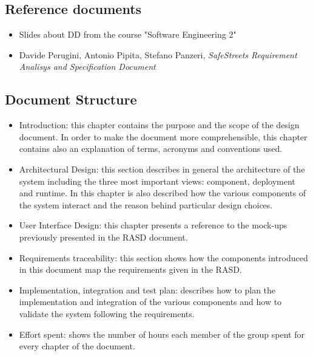 \subsection{Reference documents}
\begin{itemize}
	\item Slides about DD from the course "Software Engineering 2"
	\item Davide Perugini, Antonio Pipita, Stefano Panzeri, \textit{SafeStreets Requirement Analisys and Specification Document}
\end{itemize}
\subsection{Document Structure}
\begin{itemize}
	\item Introduction: this chapter contains the purpose and the scope of the design document. In order to make the document more comprehensible, this chapter contains also an explanation of terms, acronyms and conventions used.
	\item Architectural Design: this section describes in general the architecture of the system including the three most important views: component, deployment and runtime. In this chapter is also described how the various components of the system interact and the reason behind particular design choices.
	\item User Interface Design: this chapter presents a reference to the mock-ups previously presented in the RASD document.
	\item Requirements traceability: this section shows how the components introduced in this document map the requirements given in the RASD.
	\item Implementation, integration and test plan: describes how to plan the implementation and integration of the various components and how to validate the system following the requirements.
	\item Effort spent: shows the number of hours each member of the group spent for every chapter of the document.
\end{itemize}